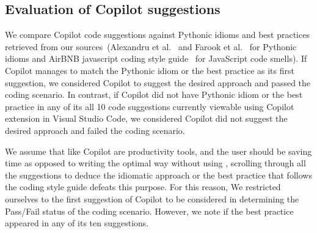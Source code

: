 \subsection{Evaluation of Copilot suggestions}
\label{evaluation}
We compare Copilot code suggestions against Pythonic idioms and best practices retrieved from our sources~(Alexandru et al.~\cite{Alexandru2018} and Farook et al.~\cite{idioms} for Pythonic idioms and AirBNB javascript coding style guide~\cite{airbnb_code} for JavaScript code smells). If Copilot manages to match the Pythonic idiom or the best practice as its first suggestion, we considered Copilot to suggest the desired approach and passed the coding scenario. 
In contrast, if Copilot did not have Pythonic idiom or the best practice in any of its all 10 code suggestions currently viewable using Copilot extension in Visual Studio Code, we considered Copilot did not suggest the desired approach and failed the coding scenario.

We assume that \cct{} like Copilot are productivity tools, and the user should be saving time as opposed to writing the optimal way without using \cct{}, scrolling through all the suggestions to deduce the idiomatic approach or the best practice that follows the coding style guide defeats this purpose. 
For this reason, We restricted ourselves to the first suggestion of Copilot to be considered in determining the Pass/Fail status of the coding scenario. However, we note if the best practice appeared in any of its ten suggestions.